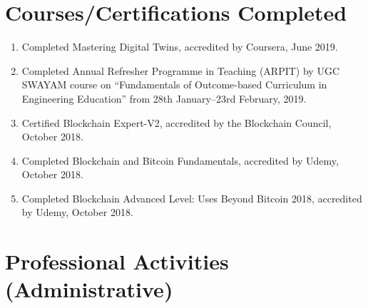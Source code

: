 \documentclass[11pt,a4paper]{moderncv}
\begin{document}
\section{\textbf{Courses/Certifications Completed}}

\begin{adjustwidth}{6em}{0pt}
	\begin{enumerate}
		\item Completed Mastering Digital Twins, accredited by Coursera, June 2019.
		
		\item Completed Annual Refresher Programme in Teaching (ARPIT) by UGC SWAYAM course on “Fundamentals of Outcome-based Curriculum in Engineering Education” from 28th January–23rd February, 2019.
		
		\item Certified Blockchain Expert-V2, accredited by the Blockchain Council, October 2018.
		
		\item Completed Blockchain and Bitcoin Fundamentals, accredited by Udemy, October 2018.
		
		\item Completed Blockchain Advanced Level: Uses Beyond Bitcoin 2018, accredited by Udemy, October 2018.
		
	\end{enumerate}
\end{adjustwidth}



\section{\textbf{Professional Activities (Administrative)}}
\end{document}
